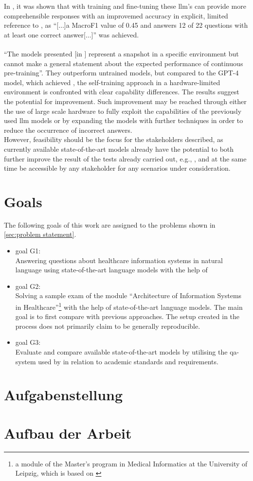 In \citet{Paul_Keller}, it was shown that with training and fine-tuning these \ac{llm}'s can provide more comprehensible responses with an improvemed accuracy in explicit, limited reference to \citet{bb2}, as \enquote{[$\dots$]a MacroF1 value of \num{0.45} and answers \num{12} of \num{22} questions with at least one correct answer[$\dots$]} was achieved.\\\\ 
\enquote{The models presented [in \citet{Paul_Keller}] represent a snapshot in a specific environment but cannot make a general statement about the expected performance of continuous pre-training}\citep{Paul_Keller}.
They outperform untrained models, but compared to the GPT-4 model, which achieved \citep{Paul_Keller}, the self-training approach in a hardware-limited environment is confronted with clear capability differences.
%
The results suggest the potential for improvement. 
Such improvement may be reached through either the use of large scale hardware to fully exploit the capabilities of the previously used \ac{llm} models or by expanding the models with further techniques in order to reduce the occurrence of incorrect answers. \\
%
However, feasibility should be the focus for the stakeholders described, as currently available state-of-the-art models already have the potential to both further improve the result of the tests already carried out, e.g., \citet{Paul_Keller}, and at the same time be accessible by any stakeholder for any scenarios under consideration.

\section{Goals}\label{sec:goals}
The following goals of this work are assigned to the problems shown in \cref{sec:problem statement}.
\begin{itemize}
  \item goal G1:\\
    Answering questions about healthcare information systems in natural language using state-of-the-art language models with the help of \citet{bb2} 
  \item goal G2:\\
   Solving a sample exam of the module \enquote{Architecture of Information Systems in Healthcare}\footnote{\raggedright{}a module of the Master's program in Medical Informatics at the University of Leipzig, which is based on \citet{bb}} with the help of state-of-the-art language models.\@
   The main goal is to first compare with previous approaches.
   The setup created in the process does not primarily claim to be generally reproducible.
   \item goal G3:\\
    Evaluate and compare available state-of-the-art models by utilising the \ac{qa}-system used by \citet{Paul_Keller} in relation to academic standards and requirements.
\end{itemize}
\section{Aufgabenstellung}



\section{Aufbau der Arbeit}
